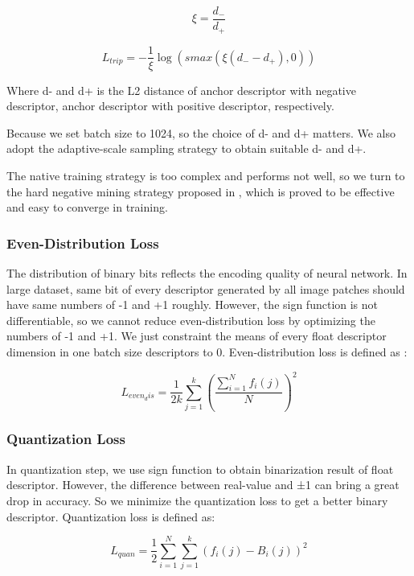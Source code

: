 \documentclass[conference]{IEEEtran}
\begin{document}
\begin{equation}
\xi  = \frac{d _{-}}{d _{+}}
\end{equation}

\begin{equation}
L_{trip}  = - \frac{1}{\xi}\log (smax(\xi( d _{-} - d _{+}  ) , 0)) 
\end{equation}

Where d- and d+ is the L2 distance of anchor descriptor with negative descriptor, anchor descriptor with positive descriptor, respectively. 

Because we set batch size to 1024, so the choice of d- and d+ matters. We also adopt the adaptive-scale sampling strategy to obtain suitable d- and d+.

The native training strategy is too complex and performs not well, so we turn to the hard negative mining strategy proposed in \cite{c15}, which is proved to be effective and easy to converge in training. 

\subsubsection{Even-Distribution Loss} 
The distribution of binary bits reflects the encoding quality of neural network. In large dataset, same bit of every descriptor generated by all image patches should have same numbers of -1 and +1 roughly. However, the sign function is not differentiable, so we cannot reduce even-distribution loss by optimizing the numbers of -1 and +1. We just constraint the means of every float descriptor dimension in one batch size descriptors to 0. Even-distribution loss is defined as :

\begin{equation}
L_{even_dis}  =  \frac{1}{2k}\sum\limits_{j=1}^{k}\left(\frac{\sum\limits_{i=1}^{N}f_i(j)}{N}\right )^2
\end{equation}


\subsubsection{Quantization Loss} 
In quantization step, we use sign function to obtain binarization result of float descriptor. However, the difference between real-value and ±1 can bring a great drop in accuracy. So we minimize the quantization loss to get a better binary descriptor. Quantization loss is defined as:

\begin{equation}
L_{quan}  =  \frac{1}{2}\sum\limits_{i=1}^{N} \sum\limits_{j=1}^{k} \left(f_i(j)-B_i(j) \right )^2
\end{equation}
\end{document}
